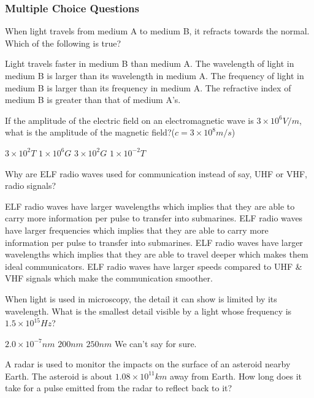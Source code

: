 \documentclass[12pt,addpoints]{exam}
\begin{document}
{{{				\subsubsection*{Multiple Choice Questions}
				\begin{questions}
					\question When light travels from medium A to medium B, it refracts towards the normal. Which of the following is true?
					\begin{choices}
						\choice Light travels faster in medium B than medium A.
						\choice The wavelength of light in medium B is larger than its wavelength in medium A.
						\choice The frequency of light in medium B is larger than its frequency in medium A.
						\choice The refractive index of medium B is greater than that of medium A's.
					\end{choices}
					\question If the amplitude of the electric field on an electromagnetic wave is $3\times10^{6}V/m$, what is the amplitude of the magnetic field?($c=3\times10^{8}m/s$) \\
					\begin{oneparchoices}
						\choice $3\times10^2T$
						\choice $1\times10^6G$
						\choice $3\times10^{2}G$
						\choice $1\times10^{-2}T$	
					\end{oneparchoices}
					\question Why are ELF radio waves used for communication instead of say, UHF or VHF, radio signals?
					\begin{choices}
						\choice ELF radio waves have larger wavelengths which implies that they are able to carry more information per pulse to transfer into submarines.
						\choice ELF radio waves have larger frequencies which implies that they are able to carry more information per pulse to transfer into submarines.
						\choice ELF radio waves have larger wavelengths which implies that they are able to travel deeper which makes them ideal communicators.
						\choice ELF radio waves have larger speeds compared to UHF \& VHF signals which make the communication smoother.
					\end{choices}
					\question When light is used in microscopy, the detail it can show is limited by its wavelength. What is the smallest detail visible by a light whose frequency is $1.5\times10^{15}Hz$? \\
					\begin{oneparchoices}
						\choice $2.0\times10^{-7}nm$
						\choice $200nm$
						\choice $250nm$
						\choice We can't say for sure.
					\end{oneparchoices}
					\question A radar is used to monitor the impacts on the surface of an asteroid nearby Earth. The asteroid is about $1.08\times10^{11}km$ away from Earth. How long does it take for a pulse emitted from the radar to reflect back to it?\\

\end{questions}}}}
\end{document}

